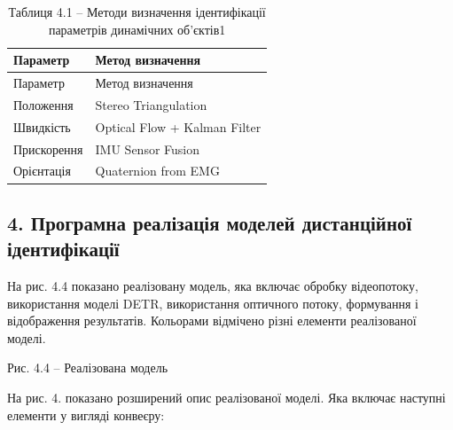 \documentclass[
]{article}
\begin{document}
\begin{longtable}[]{@{}
  >{\raggedright\arraybackslash}p{}
  >{\raggedright\arraybackslash}p{}@{}}
\caption{\protect{}\label{_Ref221399609}{}Таблиця 4.1 -- Методи визначення ідентифікації параметрів динамічних об'єктів1}\tabularnewline
\toprule\noalign{}
\begin{minipage}[b]{\linewidth}\raggedright
Параметр
\end{minipage} & \begin{minipage}[b]{\linewidth}\raggedright
Метод визначення
\end{minipage} \\
\midrule\noalign{}
\endfirsthead
\toprule\noalign{}
\begin{minipage}[b]{\linewidth}\raggedright
Параметр
\end{minipage} & \begin{minipage}[b]{\linewidth}\raggedright
Метод визначення
\end{minipage} \\
\midrule\noalign{}
\endhead
\bottomrule\noalign{}
\endlastfoot
Положення & Stereo Triangulation \\
Швидкість & Optical Flow + Kalman Filter \\
Прискорення & IMU Sensor Fusion \\
Орієнтація & Quaternion from EMG \\
\end{longtable}

\subsection{4. Програмна реалізація моделей дистанційної ідентифікації}\label{ux43fux440ux43eux433ux440ux430ux43cux43dux430-ux440ux435ux430ux43bux456ux437ux430ux446ux456ux44f-ux43cux43eux434ux435ux43bux435ux439-ux434ux438ux441ux442ux430ux43dux446ux456ux439ux43dux43eux457-ux456ux434ux435ux43dux442ux438ux444ux456ux43aux430ux446ux456ux457}

На рис. 4.4 показано реалізовану модель, яка включає обробку відеопотоку, використання моделі DETR, використання оптичного потоку, формування і відображення результатів. Кольорами відмічено різні елементи реалізованої моделі.

Рис. 4.4 -- Реалізована модель

На рис. 4. показано розширений опис реалізованої моделі. Яка включає наступні елементи у вигляді конвеєру:
\end{document}
